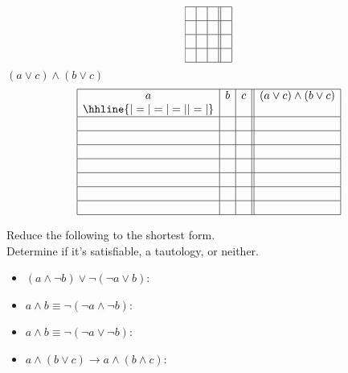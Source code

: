 \documentclass{exam}
\def\land{\wedge}           %
\def\lor{\vee}              %
\def\lnot{\neg}             %
\begin{document}
\begin{questions}
$$\begin{array}{|c|c|c||c|}
  \hline
     &    &    &                     \\
  \hline
     &    &    &                     \\
  \hline
     &    &    &                     \\
  \hline
     &    &    &                     \\
  \hline
\end{array} 
$$
$(a \lor c) \land (b \lor c)$
$$
\begin{array}{|c|c|c||c|}
  \hline
  a  & b  & c  & (a \lor c) \land (b \lor c) \\
  \hhline{|=|=|=||=|}
     &    &    &                             \\
  \hline
     &    &    &                             \\
  \hline
     &    &    &                             \\
  \hline
     &    &    &                             \\
  \hline
     &    &    &                             \\
  \hline
     &    &    &                             \\
  \hline
     &    &    &                             \\
  \hline
     &    &    &                             \\
  \hline
\end{array} 
$$

\pagebreak
\question


Reduce the following to the shortest form.\\
Determine if it's satisfiable, a tautology, or neither.
\begin{itemize}
    \item $(a \land \lnot b) \lor \lnot (\lnot a \lor b)$: \\
        \vspace{4cm}
    \item $a \land b \equiv \lnot (\lnot a \land \lnot b)$: \\ 
        \vspace{4cm}
    \item $a \land b \equiv \lnot (\lnot a \lor \lnot b)$: \\ 
        \vspace{4cm}
    \item $a \land (b \lor c) \to a \land (b \land c)$: \\ 
        \vspace{4cm}
\end{itemize}



\end{questions}
\end{document}
